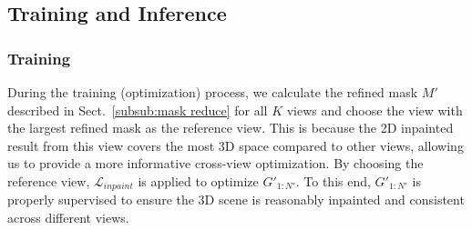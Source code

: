 

\subsection{Training and Inference}
\label{subsec:train and inference}
\subsubsection{Training}
During the training (optimization) process, we calculate the refined mask $M'$ described in Sect.~\ref{subsub:mask reduce} for all $K$ views and choose the view with the largest refined mask as the reference view. This is because the 2D inpainted result from this view covers the most 3D space compared to other views, allowing us to provide a more informative cross-view optimization. By choosing the reference view, $\mathcal{L}_{inpaint}$ is applied to optimize $G'_{1:N'}$. To this end, $G'_{1:N'}$ is properly supervised to ensure the 3D scene is reasonably inpainted and consistent across different views. 

